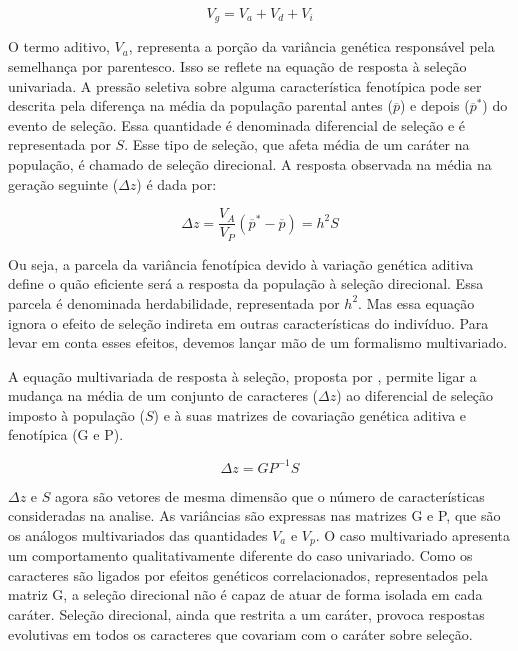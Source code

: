 \begin{equation}
    V_g = V_a + V_d + V_{i}
    \label{compgen}
\end{equation}

O termo aditivo, $V_a$, representa a porção da variância genética
responsável pela semelhança por parentesco.
Isso se reflete na equação de resposta à seleção univariada.
A pressão seletiva sobre alguma característica fenotípica pode ser descrita
pela diferença na média da população parental antes ($\overline p$) e depois
($\overline p^*$) do evento de seleção.
Essa quantidade é denominada diferencial de seleção e é representada por
$S$.
Esse tipo de seleção, que afeta média de um caráter na população, é
chamado de seleção direcional.
A resposta observada na média na geração seguinte ($\Delta z$) é dada
por:

\begin{equation}
    \Delta z = \frac{V_A}{V_P} (\overline p^* - \overline p) = h^2S
\end{equation}

Ou seja, a parcela da variância fenotípica devido à variação genética
aditiva define o quão eficiente será a resposta da população à seleção
direcional.
Essa parcela é denominada herdabilidade, representada por $h^2$.
Mas essa equação ignora o efeito de seleção indireta em outras
características do indivíduo.
Para levar em conta esses efeitos, devemos
lançar mão de um formalismo multivariado.

A equação multivariada de resposta à seleção,
proposta por \cite{Lande1979}, permite ligar a mudança na média de um
conjunto de caracteres ($\Delta z$) ao diferencial de seleção imposto à população
($S$) e à suas matrizes de covariação genética aditiva e fenotípica (G e P).

\begin{equation}
    \Delta z = GP^{-1}S
\end{equation}
 
$\Delta z$ e $S$ agora são vetores de mesma dimensão que o número
de características consideradas na analise.
As variâncias são expressas nas matrizes G e P, que são os análogos
multivariados das quantidades $V_a$ e $V_p$.
O caso multivariado apresenta um comportamento qualitativamente
diferente do caso univariado.
Como os caracteres são ligados por efeitos genéticos correlacionados,
representados pela matriz G, a seleção direcional não é capaz de atuar de
forma isolada em cada caráter.
Seleção direcional, ainda que restrita a um caráter, provoca respostas
evolutivas em todos os caracteres que covariam com o caráter sobre
seleção.

